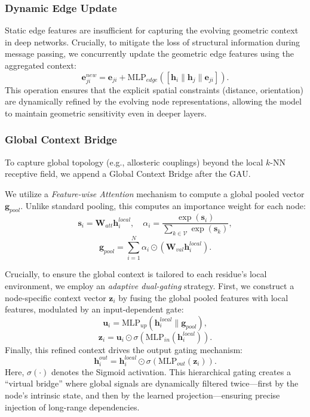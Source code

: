\documentclass{article}
\theoremstyle{plain}
\theoremstyle{definition}
\theoremstyle{remark}
\begin{document}
{\subsubsection{Dynamic Edge Update}
Static edge features are insufficient for capturing the evolving geometric context in deep networks. Crucially, to mitigate the loss of structural information during message passing, we concurrently update the geometric edge features using the aggregated context:
\begin{equation}
    \mathbf{e}_{ji}^{new} = \mathbf{e}_{ji} + \text{MLP}_{edge}([\mathbf{h}_i \parallel \mathbf{h}_j \parallel \mathbf{e}_{ji}]).
\end{equation}
This operation ensures that the explicit spatial constraints (distance, orientation) are dynamically refined by the evolving node representations, allowing the model to maintain geometric sensitivity even in deeper layers.

\subsubsection{Global Context Bridge}
To capture global topology (e.g., allosteric couplings) beyond the local $k$-NN receptive field, we append a Global Context Bridge after the GAU.

We utilize a \textit{Feature-wise Attention} mechanism to compute a global pooled vector $\mathbf{g}_{pool}$. Unlike standard pooling, this computes an importance weight for each node:
\begin{equation}
    \mathbf{s}_i = \mathbf{W}_{att} \mathbf{h}_i^{local}, \quad 
    \alpha_i = \frac{\exp(\mathbf{s}_i)}{\sum_{k \in \mathcal{V}} \exp(\mathbf{s}_k)},
\end{equation}
\begin{equation}
    \mathbf{g}_{pool} = \sum_{i=1}^{N} \alpha_i \odot (\mathbf{W}_{val} \mathbf{h}_i^{local}).
\end{equation}

Crucially, to ensure the global context is tailored to each residue's local environment, we employ an \textit{adaptive dual-gating} strategy. First, we construct a node-specific context vector $\mathbf{z}_i$ by fusing the global pooled features with local features, modulated by an input-dependent gate:
\begin{equation}
    \mathbf{u}_i = \mathrm{MLP}_{up}(\mathbf{h}_i^{local} \parallel \mathbf{g}_{pool}),
\end{equation}
\begin{equation}
    \mathbf{z}_i = \mathbf{u}_i \odot \sigma(\mathrm{MLP}_{in}(\mathbf{h}_i^{local})).
\end{equation}
Finally, this refined context drives the output gating mechanism:
\begin{equation}
    \mathbf{h}_i^{out} = \mathbf{h}_i^{local} \odot \sigma(\mathrm{MLP}_{out}(\mathbf{z}_i)).
\end{equation}
Here, $\sigma(\cdot)$ denotes the Sigmoid activation. This hierarchical gating creates a ``virtual bridge'' where global signals are dynamically filtered twice—first by the node's intrinsic state, and then by the learned projection—ensuring precise injection of long-range dependencies.


}
\end{document}
